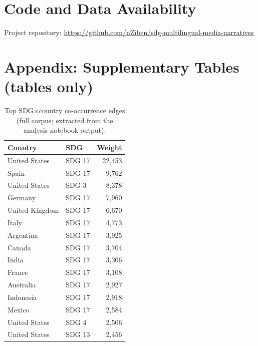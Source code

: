 \documentclass[11pt]{article}
\begin{document}
\section*{Code and Data Availability}
Project repository: \url{https://github.com/nZiben/sdg-multilingual-media-narratives}

\printbibliography

\appendix
\renewcommand{\thetable}{A\arabic{table}}
\setcounter{table}{0}

\section{Appendix: Supplementary Tables (tables only)}

\begin{table}[H]
\centering
\caption{Top SDG$\times$country co-occurrence edges (full corpus; extracted from the analysis notebook output).}
\label{tab:top_edges}
\begin{tabular}{llr}
\toprule
Country & SDG & Weight \\
\midrule
United States & SDG 17 & 22{,}453 \\
Spain & SDG 17 & 9{,}762 \\
United States & SDG 3 & 8{,}378 \\
Germany & SDG 17 & 7{,}960 \\
United Kingdom & SDG 17 & 6{,}670 \\
Italy & SDG 17 & 4{,}773 \\
Argentina & SDG 17 & 3{,}925 \\
Canada & SDG 17 & 3{,}704 \\
India & SDG 17 & 3{,}306 \\
France & SDG 17 & 3{,}108 \\
Australia & SDG 17 & 2{,}927 \\
Indonesia & SDG 17 & 2{,}918 \\
Mexico & SDG 17 & 2{,}584 \\
United States & SDG 4 & 2{,}506 \\
United States & SDG 13 & 2{,}456 \\
\bottomrule
\end{tabular}
\end{table}


\end{document}
